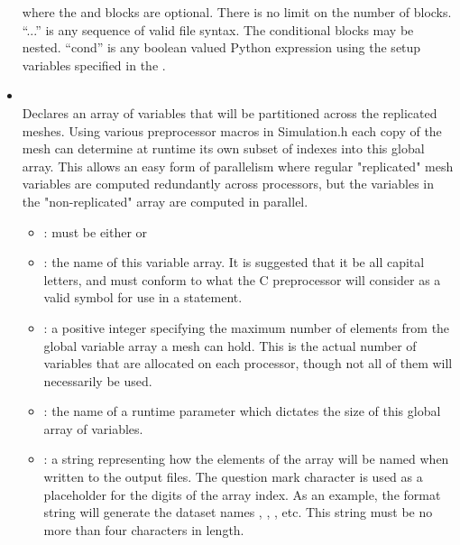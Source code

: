 \begin{itemize}
\noindent where the  and  blocks are optional. There
is no limit on the number of  blocks. ``...'' is any sequence
of valid  file syntax. The conditional blocks may be nested.
``cond'' is any boolean valued Python expression using the setup variables
specified in the .

\item {}    
\\
Declares an array of  variables that will be partitioned across the
replicated meshes.  Using various preprocessor macros in Simulation.h each copy of
the mesh can determine at runtime its own subset of indexes into this global
array.  This allows an easy form of parallelism where regular "replicated"
mesh variables are computed redundantly across processors, but the variables in
the "non-replicated" array are computed in parallel.

\begin{itemize}
\item {}: must be either  or \\

\item {}: the name of this variable array.  It is suggested that it be
all capital letters, and must conform to what the C preprocessor will consider as
a valid symbol for use in a  statement.

\item {}: a positive integer specifying the maximum number of elements
from the global variable array a mesh can hold.  This is the actual number of
 variables that are allocated on each processor, though not all of
them will necessarily be used.\\

\item {}: the name of a runtime parameter which dictates the size
of this global array of variables.\\

\item {}: a string representing how the elements of the array will
be named when written to the output files.  The question mark character  is
used as a placeholder for the digits of the array index.  As an example, the format
string  will generate the dataset names , ,
, etc.  This string must be no more than four characters in length.\\
\end{itemize}


\end{itemize}
